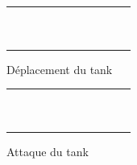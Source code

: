 \documentclass[a4paper]{scrreprt}
\begin{document}
\begin{figure}
    \centering
    \begin{tabular}{|c|c|c|c|c|c|c|c|c|c|c|}
        \hline
        &&&&&&&&&&\\ \hline  
        &&&&&&&&&&\\ \hline 
        &&&&&&&&&&\\ \hline
        &&&&&\cellcolor{cblue}&&&&&\\ \hline
        &&&&\cellcolor{cblue}&\cellcolor{cblue}&\cellcolor{cblue}&&&&\\ \hline
        &&&&\cellcolor{cblue}&\cellcolor{yellow}&\cellcolor{cblue}&&&&\\ \hline
        &&&&\cellcolor{cblue}&\cellcolor{cblue}&\cellcolor{cblue}&&&&\\ \hline
        &&&&&\cellcolor{cblue}&&&&&\\ \hline
        &&&&&&&&&&\\ \hline
        &&&&&&&&&&\\ \hline
        &&&&&&&&&&\\ \hline
        
    \end{tabular}
    \caption{Déplacement du tank}
    \label{fig:tankdep}
\end{figure}

\begin{figure}
    \centering
    \begin{tabular}{|c|c|c|c|c|c|c|c|c|c|c|}
        \hline
        &&&&&&&&&&\\ \hline  
        &&&&&&&&&&\\ \hline 
        &&&&&&&&&&\\ \hline
        &&&&&&&&&&\\ \hline
        &&&&\cellcolor{cred}&\cellcolor{cred}&\cellcolor{cred}&&&&\\ \hline
        &&&&\cellcolor{cred}&\cellcolor{yellow}&\cellcolor{cred}&&&&\\ \hline
        &&&&\cellcolor{cred}&\cellcolor{cred}&\cellcolor{cred}&&&&\\ \hline
        &&&&&&&&&&\\ \hline
        &&&&&&&&&&\\ \hline
        &&&&&&&&&&\\ \hline
        &&&&&&&&&&\\ \hline
        
    \end{tabular}
    \caption{Attaque du tank}
    \label{fig:tankatt}
\end{figure}
\end{document}
